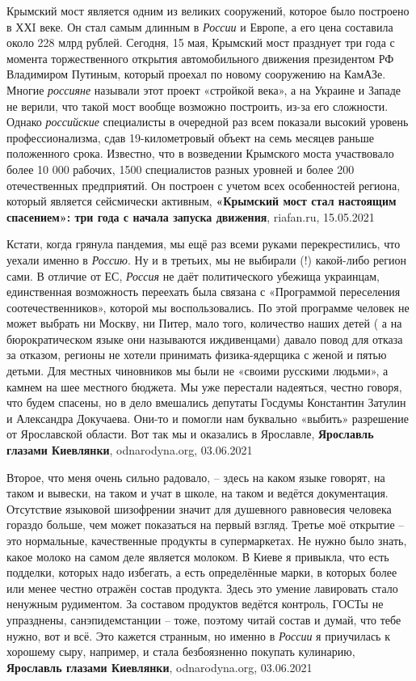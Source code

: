 Крымский мост является одним из великих сооружений, которое было построено в
ХХI веке. Он стал самым длинным в \emph{России} и Европе, а его цена составила
около 228 млрд рублей. Сегодня, 15 мая, Крымский мост празднует три года с
момента торжественного открытия автомобильного движения президентом РФ
Владимиром Путиным, который проехал по новому сооружению на КамАЗе.  Многие
\emph{россияне} называли этот проект «стройкой века», а на Украине и Западе не
верили, что такой мост вообще возможно построить, из-за его сложности. Однако
\emph{российские} специалисты в очередной раз всем показали высокий уровень
профессионализма, сдав 19-километровый объект на семь месяцев раньше
положенного срока.  Известно, что в возведении Крымского моста участвовало
более 10 000 рабочих, 1500 специалистов разных уровней и более 200
отечественных предприятий. Он построен с учетом всех особенностей региона,
который является сейсмически активным,
\textbf{«Крымский мост стал настоящим спасением»: три года с начала запуска движения},
riafan.ru, 15.05.2021

Кстати, когда грянула пандемия, мы ещё раз всеми руками перекрестились, что
уехали именно в \emph{Россию}. Ну и в третьих, мы не выбирали (!) какой-либо регион
сами. В отличие от ЕС, \emph{Россия} не даёт политического убежища украинцам,
единственная возможность переехать была связана с «Программой переселения
соотечественников», которой мы воспользовались. По этой программе человек не
может выбрать ни Москву, ни Питер, мало того, количество наших детей ( а на
бюрократическом языке они называются иждивенцами) давало повод  для отказа за
отказом, регионы не хотели принимать физика-ядерщика с женой и пятью детьми.
Для местных чиновников мы были не «своими русскими людьми», а камнем на шее
местного бюджета. Мы уже перестали надеяться, честно говоря, что будем спасены,
но в дело вмешались депутаты Госдумы Константин Затулин и Александра Докучаева.
Они-то и помогли нам буквально «выбить» разрешение от Ярославской области. Вот
так мы и оказались в Ярославле,
\textbf{Ярославль глазами Киевлянки},
odnarodyna.org, 03.06.2021

Второе, что меня очень сильно радовало, – здесь на каком языке говорят, на
таком и вывески, на таком и учат в школе, на таком и ведётся документация.
Отсутствие языковой шизофрении значит для душевного равновесия человека гораздо
больше, чем может показаться на первый взгляд. Третье моё открытие – это
нормальные, качественные продукты в супермаркетах.  Не нужно было знать, какое
молоко на самом деле является молоком. В Киеве я привыкла, что есть подделки,
которых надо избегать, а есть определённые марки, в которых более или менее
честно отражён состав продукта. Здесь это умение лавировать стало ненужным
рудиментом. За составом продуктов ведётся контроль, ГОСТы не упразднены,
санэпидемстанции – тоже, поэтому читай состав и думай, что тебе нужно, вот и
всё. Это кажется странным, но именно в \emph{России} я приучилась к хорошему сыру,
например, и стала безбоязненно покупать кулинарию,
\textbf{Ярославль глазами Киевлянки},
odnarodyna.org, 03.06.2021

